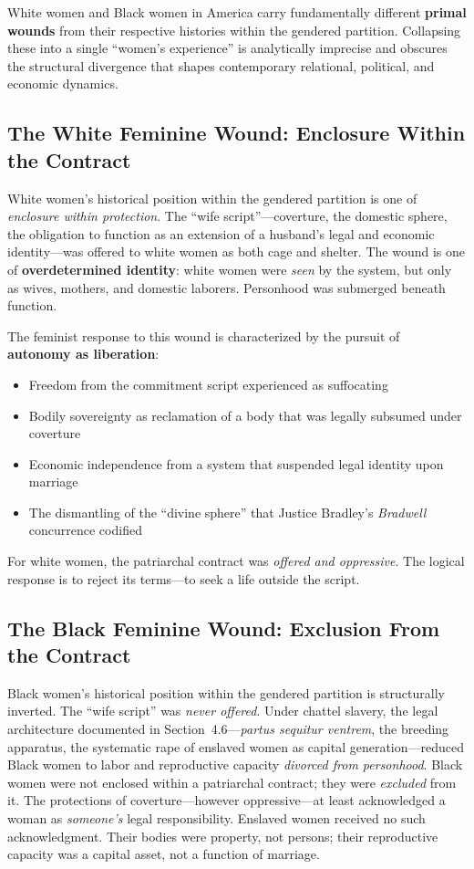 \documentclass[12pt,openany]{book}
\begin{document}
White women and Black women in America carry fundamentally different \textbf{primal wounds} from their respective histories within the gendered partition. Collapsing these into a single ``women's experience'' is analytically imprecise and obscures the structural divergence that shapes contemporary relational, political, and economic dynamics.

\subsection{The White Feminine Wound: Enclosure Within the Contract}

White women's historical position within the gendered partition is one of \textit{enclosure within protection}. The ``wife script''---coverture, the domestic sphere, the obligation to function as an extension of a husband's legal and economic identity---was offered to white women as both cage and shelter. The wound is one of \textbf{overdetermined identity}: white women were \textit{seen} by the system, but only as wives, mothers, and domestic laborers. Personhood was submerged beneath function.

The feminist response to this wound is characterized by the pursuit of \textbf{autonomy as liberation}:

\begin{itemize}
    \item Freedom from the commitment script experienced as suffocating
    \item Bodily sovereignty as reclamation of a body that was legally subsumed under coverture
    \item Economic independence from a system that suspended legal identity upon marriage
    \item The dismantling of the ``divine sphere'' that Justice Bradley's \textit{Bradwell} concurrence codified
\end{itemize}

For white women, the patriarchal contract was \textit{offered and oppressive}. The logical response is to reject its terms---to seek a life outside the script.

\subsection{The Black Feminine Wound: Exclusion From the Contract}

Black women's historical position within the gendered partition is structurally inverted. The ``wife script'' was \textit{never offered}. Under chattel slavery, the legal architecture documented in Section~4.6---\textit{partus sequitur ventrem}, the breeding apparatus, the systematic rape of enslaved women as capital generation---reduced Black women to labor and reproductive capacity \textit{divorced from personhood}. Black women were not enclosed within a patriarchal contract; they were \textit{excluded} from it. The protections of coverture---however oppressive---at least acknowledged a woman as \textit{someone's} legal responsibility. Enslaved women received no such acknowledgment. Their bodies were property, not persons; their reproductive capacity was a capital asset, not a function of marriage.
\end{document}
